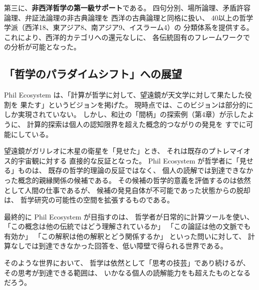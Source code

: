 \documentclass[a4paper,11pt]{ltjsarticle}
\begin{document}
第三に、\textbf{非西洋哲学の第一級サポート}である。
四句分別、場所論理、矛盾許容論理、弁証法論理の非古典論理を
西洋の古典論理と同格に扱い、
40以上の哲学学派（西洋18、東アジア8、南アジア9、イスラーム4）の
分類体系を提供する。
これにより、西洋的カテゴリへの還元なしに、
各伝統固有のフレームワークでの分析が可能となった。

\subsection{「哲学のパラダイムシフト」への展望}

Phil Ecosystem は、「計算が哲学に対して、望遠鏡が天文学に対して果たした役割を
果たす」というビジョンを掲げた。
現時点では、このビジョンは部分的にしか実現されていない。
しかし、和辻の「間柄」の探索例（第4章）が示したように、
計算的探索は個人の認知限界を超えた概念的つながりの発見を
すでに可能にしている。

望遠鏡がガリレオに木星の衛星を「見せた」とき、
それは既存のプトレマイオス的宇宙観に対する
直接的な反証となった。
Phil Ecosystem が哲学者に「見せる」ものは、
既存の哲学的理論の反証ではなく、
個人の読解では到達できなかった概念的親縁関係の候補である。
その候補の哲学的意義を評価するのは依然として人間の仕事であるが、
候補の発見自体が不可能であった状態からの脱却は、
哲学研究の可能性の空間を拡張するものである。

最終的に Phil Ecosystem が目指すのは、
哲学者が日常的に計算ツールを使い、
「この概念は他の伝統ではどう理解されているか」
「この論証は他の文脈でも有効か」
「この解釈は他の解釈とどう関係するか」
といった問いに対して、
計算なしでは到達できなかった回答を、低い障壁で得られる世界である。

そのような世界において、
哲学は依然として「思考の技芸」であり続けるが、
その思考が到達できる範囲は、
いかなる個人の読解能力をも超えたものとなるだろう。
\end{document}
